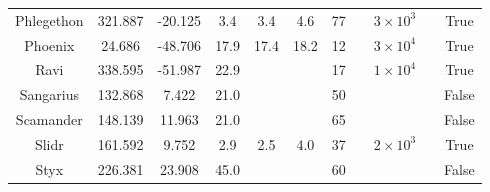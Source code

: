 \begin{table}
\begin{tabular}{ccccccccccc}
Phlegethon & 321.887 & -20.125 & 3.4 & 3.4 & 4.6 & 77 & \citet{ibata:2023} & $3 \times 10^{3}$ &  & True \\
Phoenix & 24.686 & -48.706 & 17.9 & 17.4 & 18.2 & 12 & \citet{shipp:2019} & $3 \times 10^{4}$ & \citet{shipp:2018} & True \\
Ravi & 338.595 & -51.987 & 22.9 & & & 17 & \citet{shipp:2018} & $1 \times 10^{4}$ & \citet{shipp:2018} & True \\
Sangarius & 132.868 & 7.422 & 21.0 & & & 50 & \citet{grillmair:2017} & &  & False \\
Scamander & 148.139 & 11.963 & 21.0 & & & 65 & \citet{grillmair:2017} & &  & False \\
Slidr & 161.592 & 9.752 & 2.9 & 2.5 & 4.0 & 37 & \citet{ibata:2023} & $2 \times 10^{3}$ &  & True \\
Styx & 226.381 & 23.908 & 45.0 & & & 60 & \citet{grillmair:2009} & &  & False \\
\hline \hline
\end{tabular}
\end{table}
